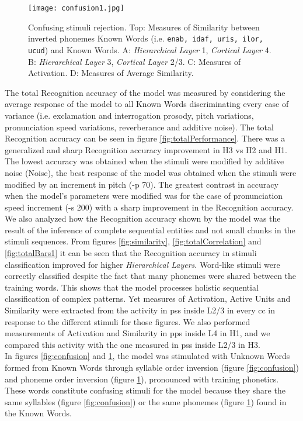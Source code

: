 \documentclass[11pt,a4paper]{article}
\begin{document}
\begin{figure}[h]
\centering
\texttt{[image: confusion1.jpg]}
\caption{\scriptsize{Confusing stimuli rejection.
Top: Measures of Similarity between inverted phonemes Known Words
(i.e. \texttt{enab, idaf, uris, ilor, ucud}) and Known Words.
A: \textit{Hierarchical Layer} 1, \textit{Cortical Layer} 4.
B: \textit{Hierarchical Layer} 3, \textit{Cortical Layer} 2/3.
C: Measures of Activation.
D: Measures of Average Similarity.}}
\label{fig:confusion1}
\end{figure}

The total Recognition accuracy of the model was measured by considering the average response of the model
to all Known Words discriminating every case of variance (i.e. exclamation and interrogation prosody, pitch variations,
pronunciation speed variations, reverberance and additive noise).
The total Recognition accuracy can be seen in figure \ref{fig:totalPerformance}.
There was a generalized and sharp Recognition accuracy improvement
in H3 vs H2 and H1.
The lowest accuracy was obtained when the stimuli were modified by additive noise (Noise),
the best response of the model was obtained when the stimuli were modified by an increment in pitch (-p 70).
The greatest contrast in accuracy when the model's parameters were modified was for the case
of pronunciation speed increment (-s 200) with a sharp improvement in the Recognition accuracy.\\

We also analyzed how the Recognition accuracy shown by the model was the result
of the inference of complete sequential entities and not small chunks
in the stimuli sequences.
From figures \ref{fig:similarity}, \ref{fig:totalCorrelation} and \ref{fig:totalBars1} it can be seen that
the Recognition accuracy in stimuli classification improved for higher \textit{Hierarchical Layers}.
Word-like stimuli were correctly classified despite the fact that many phonemes were
shared between the training words.
This shows that the model processes holistic sequential classification of complex patterns.
Yet measures of Activation, Active Units and Similarity were extracted from the activity
in \ac{ps}s inside L2/3 in every \ac{cc} in response to the different stimuli for those figures.
We also performed measurements of Activation and Similarity in \ac{pp}s inside L4 in H1, and we compared
this activity with the one measured in \ac{ps}s inside L2/3 in H3.\\

In figures \ref{fig:confusion} and \ref{fig:confusion1}, the model was stimulated with Unknown Words
formed from Known Words through syllable order inversion (figure \ref{fig:confusion}) and
phoneme order inversion (figure \ref{fig:confusion1}), pronounced with training phonetics.
These words constitute confusing stimuli for the model because they share the same syllables
(figure \ref{fig:confusion}) or the same phonemes (figure \ref{fig:confusion1}) found in the Known Words.\\
\end{document}

